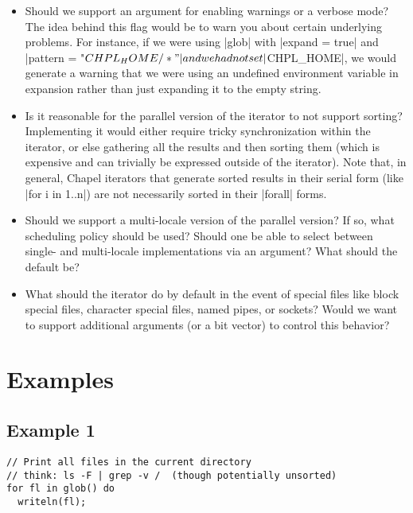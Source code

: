 \documentclass{article}
\begin{document}
\begin{itemize}
\item Should we support an argument for enabling warnings or a verbose
  mode?  The idea behind this flag would be to warn you about certain
  underlying problems. For instance, if we were using |glob| with
  |expand = true| and |pattern = "$CHPL_HOME/*"| and we had not set
  |$CHPL_HOME|, we would generate a warning that we were using an
  undefined environment variable in expansion rather than just
  expanding it to the empty string.

\item Is it reasonable for the parallel version of the iterator to not
  support sorting?  Implementing it would either require tricky
  synchronization within the iterator, or else gathering all the
  results and then sorting them (which is expensive and can trivially
  be expressed outside of the iterator).  Note that, in general,
  Chapel iterators that generate sorted results in their serial form
  (like |for i in 1..n|) are not necessarily sorted in their |forall|
  forms.

\item Should we support a multi-locale version of the parallel
  version?  If so, what scheduling policy should be used?  Should one
  be able to select between single- and multi-locale implementations
  via an argument?  What should the default be?

\item What should the iterator do by default in the event of special
  files like block special files, character special files, named
  pipes, or sockets?  Would we want to support additional arguments
  (or a bit vector) to control this behavior?

\end{itemize}



\section{Examples}\label{s:examples}
\subsection{Example 1}
\begin{lstlisting}
// Print all files in the current directory
// think: ls -F | grep -v /  (though potentially unsorted)
for fl in glob() do
  writeln(fl);
\end{lstlisting}
\end{document}
